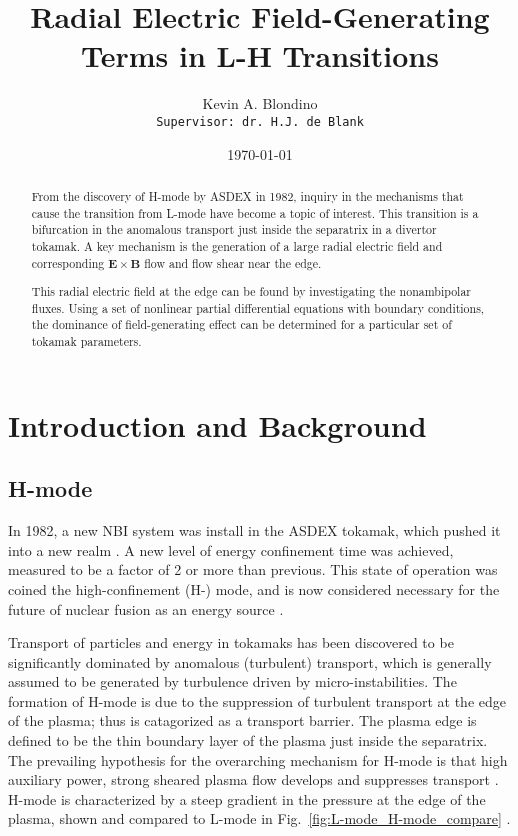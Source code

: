 \documentclass[a4paper]{article}
\author{Kevin A. Blondino \\
	\texttt{Supervisor: dr. H.J. de Blank}}
\title{Radial Electric Field-Generating Terms in L-H Transitions}
\date{\today}
\begin{document}
\maketitle


\begin{abstract}
	From the discovery of H-mode by ASDEX in 1982, inquiry in the mechanisms that cause the transition from L-mode have become a topic of interest.
	This transition is a bifurcation in the anomalous transport just inside the separatrix in a divertor tokamak.
	A key mechanism is the generation of a large radial electric field and corresponding $\mathbf{E}\times\mathbf{B}$ flow and flow shear near the edge.

	This radial electric field at the edge can be found by investigating the nonambipolar fluxes. Using a set of nonlinear partial differential equations with boundary conditions, the dominance of field-generating effect can be determined for a particular set of tokamak parameters.
\end{abstract}

\section{Introduction and Background}
\subsection{H-mode}
In 1982, a new NBI system was install in the ASDEX tokamak, which pushed it into a new realm \cite{arnoux_how_2009}.
A new level of energy confinement time was achieved, measured to be a factor of 2 or more than previous.
This state of operation was coined the high-confinement (H-) mode, and is now considered necessary for the future of nuclear fusion as an energy source \cite{wagner_development_1984}.

Transport of particles and energy in tokamaks has been discovered to be significantly dominated by anomalous (turbulent) transport, which is generally assumed to be generated by turbulence driven by micro-instabilities.
The formation of H-mode is due to the suppression of turbulent transport at the edge of the plasma; thus is catagorized as a transport barrier.
The plasma edge is defined to be the thin boundary layer of the plasma just inside the separatrix.
The prevailing hypothesis for the overarching mechanism for H-mode is that high auxiliary power, strong sheared plasma flow develops and suppresses transport \cite{freidberg_plasma_2007}.
H-mode is characterized by a steep gradient in the pressure at the edge of the plasma, shown and compared to L-mode in Fig.~\ref{fig:L-mode_H-mode_compare} \cite{weymiens_bifurcation_2014}.
\end{document}
